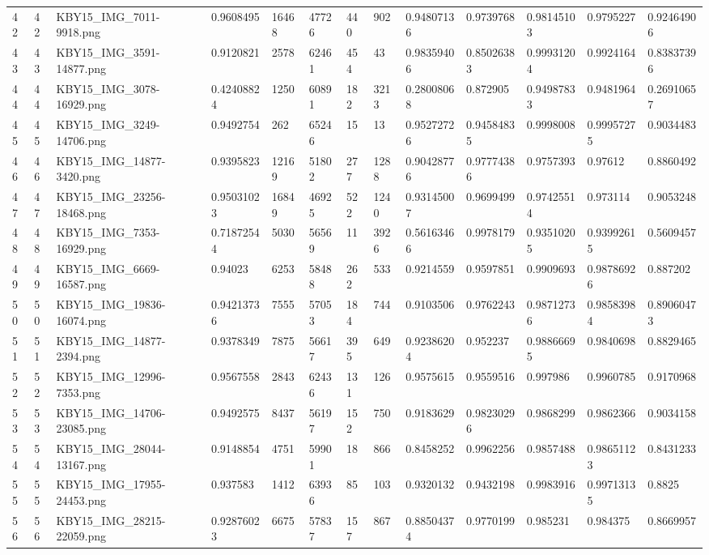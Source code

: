 \documentclass[11pt, a4paper, twoside]{report}
\begin{document}
\begin{longtable}[c]{@{}lllllllllllll@{}}
42 & 42 & KBY15\_IMG\_7011-9918.png & 0.9608495 & 16468 & 47726 & 440 & 902 & 0.94807136 & 0.9739768 & 0.98145103 & 0.9795227 & 0.92464906 \\
43 & 43 & KBY15\_IMG\_3591-14877.png & 0.9120821 & 2578 & 62461 & 454 & 43 & 0.98359406 & 0.85026383 & 0.99931204 & 0.9924164 & 0.83837396 \\
44 & 44 & KBY15\_IMG\_3078-16929.png & 0.42408824 & 1250 & 60891 & 182 & 3213 & 0.28008068 & 0.872905 & 0.94987833 & 0.9481964 & 0.26910657 \\
45 & 45 & KBY15\_IMG\_3249-14706.png & 0.9492754 & 262 & 65246 & 15 & 13 & 0.95272726 & 0.94584835 & 0.9998008 & 0.99957275 & 0.9034483 \\
46 & 46 & KBY15\_IMG\_14877-3420.png & 0.9395823 & 12169 & 51802 & 277 & 1288 & 0.90428776 & 0.97774386 & 0.9757393 & 0.97612 & 0.8860492 \\
47 & 47 & KBY15\_IMG\_23256-18468.png & 0.95031023 & 16849 & 46925 & 522 & 1240 & 0.93145007 & 0.9699499 & 0.97425514 & 0.973114 & 0.9053248 \\
48 & 48 & KBY15\_IMG\_7353-16929.png & 0.71872544 & 5030 & 56569 & 11 & 3926 & 0.56163466 & 0.9978179 & 0.93510205 & 0.93992615 & 0.5609457 \\
49 & 49 & KBY15\_IMG\_6669-16587.png & 0.94023 & 6253 & 58488 & 262 & 533 & 0.9214559 & 0.9597851 & 0.9909693 & 0.98786926 & 0.887202 \\
50 & 50 & KBY15\_IMG\_19836-16074.png & 0.94213736 & 7555 & 57053 & 184 & 744 & 0.9103506 & 0.9762243 & 0.98712736 & 0.98583984 & 0.89060473 \\
51 & 51 & KBY15\_IMG\_14877-2394.png & 0.9378349 & 7875 & 56617 & 395 & 649 & 0.92386204 & 0.952237 & 0.98866695 & 0.9840698 & 0.8829465 \\
52 & 52 & KBY15\_IMG\_12996-7353.png & 0.9567558 & 2843 & 62436 & 131 & 126 & 0.9575615 & 0.9559516 & 0.997986 & 0.9960785 & 0.9170968 \\
53 & 53 & KBY15\_IMG\_14706-23085.png & 0.9492575 & 8437 & 56197 & 152 & 750 & 0.9183629 & 0.98230296 & 0.9868299 & 0.9862366 & 0.9034158 \\
54 & 54 & KBY15\_IMG\_28044-13167.png & 0.9148854 & 4751 & 59901 & 18 & 866 & 0.8458252 & 0.9962256 & 0.9857488 & 0.98651123 & 0.8431233 \\
55 & 55 & KBY15\_IMG\_17955-24453.png & 0.937583 & 1412 & 63936 & 85 & 103 & 0.9320132 & 0.9432198 & 0.9983916 & 0.99713135 & 0.8825 \\
56 & 56 & KBY15\_IMG\_28215-22059.png & 0.92876023 & 6675 & 57837 & 157 & 867 & 0.88504374 & 0.9770199 & 0.985231 & 0.984375 & 0.8669957 \\

\end{longtable}
\end{document}

